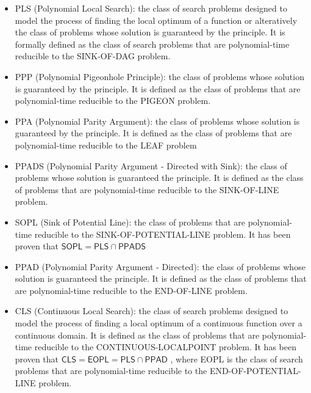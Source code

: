 \begin{itemize}
    \item \textsf{PLS} (Polynomial Local Search): the class of search problems designed to model the process of finding the local optimum of a function or alteratively the class of problems whose solution is guaranteed by the  principle. It is formally defined as the class of search problems that are polynomial-time reducible to the SINK-OF-DAG problem.
    
    \item \textsf{PPP} (Polynomial Pigeonhole Principle): the class of problems whose solution is guaranteed by the  principle. It is defined as the class of problems that are polynomial-time reducible to the PIGEON problem.
    
    \item \textsf{PPA} (Polynomial Parity Argument): the class of problems whose solution is guaranteed by the  principle. It is defined as the class of problems that are polynomial-time reducible to the LEAF problem
    
    \item \textsf{PPADS} (Polynomial Parity Argument - Directed with Sink): the class of problems whose solution is guaranteed the  principle. It is defined as the class of problems that are polynomial-time reducible to the SINK-OF-LINE problem.
    
    \item \textsf{SOPL} (Sink of Potential Line): the class of problems that are polynomial-time reducible to the SINK-OF-POTENTIAL-LINE problem. It has been proven that $\mathsf{SOPL} = \mathsf{PLS} \cap \mathsf{PPADS}$ \cite{Further_collapses_TFNP}
    
    \item \textsf{PPAD} (Polynomial Parity Argument - Directed): the class of problems whose solution is guaranteed the  principle. It is defined as the class of problems that are polynomial-time reducible to the END-OF-LINE problem.
    
    \item \textsf{CLS} (Continuous Local Search): the class of search problems designed to model the process of finding a local optimum of a continuous function over a continuous domain. It is defined as the class of problems that are polynomial-time reducible to the CONTINUOUS-LOCALPOINT problem. It has been proven that $\mathsf{CLS} = \mathsf{EOPL} = \mathsf{PLS} \cap \mathsf{PPAD}$ \cite{gradient_descent, Further_collapses_TFNP}, where \textsf{EOPL} is the class of search problems that are polynomial-time reducible to the END-OF-POTENTIAL-LINE problem.
\end{itemize}

